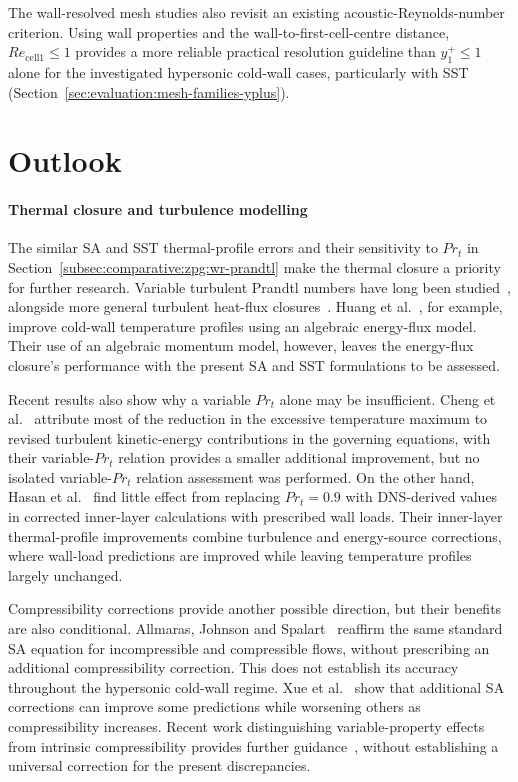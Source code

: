 The wall-resolved mesh studies also revisit an existing acoustic-Reynolds-number criterion. Using wall properties and the wall-to-first-cell-centre distance, \(Re_{\mathrm{cell1}}\le1\) provides a more reliable practical resolution guideline than \(y_1^+\le1\) alone for the investigated hypersonic cold-wall cases, particularly with SST (Section~\ref{sec:evaluation:mesh-families-yplus}).

\section{Outlook}
\label{chap:outlook}

\paragraph*{Thermal closure and turbulence modelling}
The similar SA and SST thermal-profile errors and their sensitivity to \(Pr_t\) in Section~\ref{subsec:comparative:zpg:wr-prandtl} make the thermal closure a priority for further research. Variable turbulent Prandtl numbers have long been studied~\cite{kays1994turbulent}, alongside more general turbulent heat-flux closures~\cite{bowersox2009extension}. Huang et al.~\cite{huang2020simulation}, for example, improve cold-wall temperature profiles using an algebraic energy-flux model. Their use of an algebraic momentum model, however, leaves the energy-flux closure's performance with the present SA and SST formulations to be assessed.
\par\medskip

Recent results also show why a variable \(Pr_t\) alone may be insufficient. Cheng et al.~\cite{cheng2026reynolds} attribute most of the reduction in the excessive temperature maximum to revised turbulent kinetic-energy contributions in the governing equations, with their variable-\(Pr_t\) relation provides a smaller additional improvement, but no isolated variable-\(Pr_t\) relation assessment was performed. On the other hand, Hasan et al.~\cite{hasan2025variable} find little effect from replacing \(Pr_t=0.9\) with DNS-derived values in corrected inner-layer calculations with prescribed wall loads. Their inner-layer thermal-profile improvements combine turbulence and energy-source corrections, where wall-load predictions are improved while leaving temperature profiles largely unchanged.
\par\medskip

Compressibility corrections provide another possible direction, but their benefits are also conditional. Allmaras, Johnson and Spalart~\cite[Section~2.2]{AJS2012} reaffirm the same standard SA equation for incompressible and compressible flows, without prescribing an additional compressibility correction. This does not establish its accuracy throughout the hypersonic cold-wall regime. Xue et al.~\cite{xue2024assessment} show that additional SA corrections can improve some predictions while worsening others as compressibility increases. Recent work distinguishing variable-property effects from intrinsic compressibility provides further guidance~\cite{hasan2025intrinsic,hasan2025variable,pecnik2026turbulence}, without establishing a universal correction for the present discrepancies.
\par\medskip

